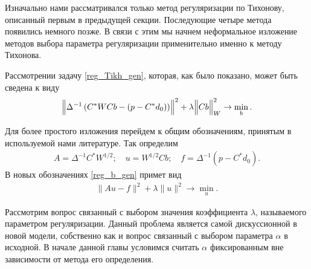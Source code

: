 \documentclass[10pt]{article}
\theoremstyle{definition}
\theoremstyle{remark}
\theoremstyle{plain}
\newcommand{\scalar}[2]{\left<#1,#2\right>}
\begin{document}
Изначально нами рассматривался только метод регуляризации по Тихонову, описанный первым в предыдущей секции. Последующие четыре метода появились немного позже. В связи с этим мы начнем неформальное изложение методов выбора параметра регуляризации применительно именно к методу Тихонова.

 Рассмотрении задачу \eqref{reg_Tikh_gen}, которая, как было показано, может быть сведена к виду
\begin{align}
\Bigl\| \Delta^{-1}\left(C^*WCb - (p-C^*d_0) \right)\Bigr\|^2 +
\lambda
\Bigl\|Cb\Bigr\|^2_W 
\rightarrow \min\limits_b \label{reg_b_gen}.
\end{align}

Для более простого изложения перейдем к общим обозначениям, принятым в используемой нами литературе. Так определим
\begin{gather*}
A = \Delta^{-1}C^*W^{1/2};\quad 
u = W^{1/2}Cb;\quad 
f = \Delta^{-1}(p-C^*d_0).
\end{gather*}
В новых обозначениях \eqref{reg_b_gen} примет вид
\begin{align}
\|Au-f\|^2 + \lambda\|u\|^2 \rightarrow \min\limits_u. \label{reg_general}
\end{align}

Рассмотрим вопрос связанный с выбором значения коэффициента $\lambda$, называемого параметром регуляризации. Данный проблема является самой дискуссионной в новой модели, собственно как и вопрос связанный с выбором параметра $\alpha$ в исходной. В начале данной главы условимся считать $\alpha$ фиксированным вне зависимости от метода его определения. 
\end{document}
